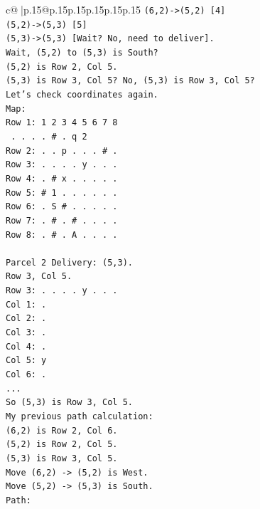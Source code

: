 \documentclass{article}
\begin{document}
{\begin{supertabular}{c@{$\;$}|p{.15\linewidth}@{}p{.15\linewidth}p{.15\linewidth}p{.15\linewidth}p{.15\linewidth}p{.15\linewidth}}
{{{\texttt{(6,2){-}>(5,2) {[}4{]}} \\
\texttt{(5,2){-}>(5,3) {[}5{]}} \\
\texttt{(5,3){-}>(5,3) {[}Wait? No, need to deliver{]}.} \\
\texttt{Wait, (5,2) to (5,3) is South?} \\
\texttt{(5,2) is Row 2, Col 5.} \\
\texttt{(5,3) is Row 3, Col 5? No, (5,3) is Row 3, Col 5?} \\
\texttt{Let's check coordinates again.} \\
\texttt{Map:} \\
\texttt{Row 1: 1 2 3 4 5 6 7 8} \\
\texttt{      . . . . \# . q 2} \\
\texttt{Row 2: . . p . . . \# .} \\
\texttt{Row 3: . . . . y . . .} \\
\texttt{Row 4: . \# x . . . . .} \\
\texttt{Row 5: \# 1 . . . . . .} \\
\texttt{Row 6: . S \# . . . . .} \\
\texttt{Row 7: . \# . \# . . . .} \\
\texttt{Row 8: . \# . A . . . .} \\
\\ 
\texttt{Parcel 2 Delivery: (5,3).} \\
\texttt{Row 3, Col 5.} \\
\texttt{Row 3: . . . . y . . .} \\
\texttt{Col 1: .} \\
\texttt{Col 2: .} \\
\texttt{Col 3: .} \\
\texttt{Col 4: .} \\
\texttt{Col 5: y} \\
\texttt{Col 6: .} \\
\texttt{...} \\
\texttt{So (5,3) is Row 3, Col 5.} \\
\texttt{My previous path calculation:} \\
\texttt{(6,2) is Row 2, Col 6.} \\
\texttt{(5,2) is Row 2, Col 5.} \\
\texttt{(5,3) is Row 3, Col 5.} \\
\texttt{Move (6,2) {-}> (5,2) is West.} \\
\texttt{Move (5,2) {-}> (5,3) is South.} \\
\texttt{Path:} \\
}}}
\end{supertabular}}
\end{document}
